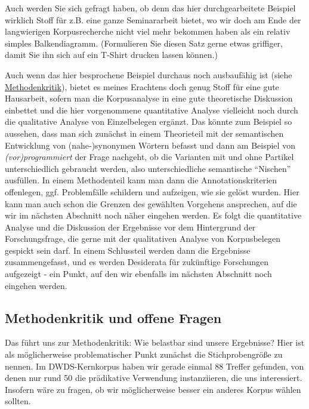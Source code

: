 \documentclass[]{article}
\begin{document}
Auch werden Sie sich gefragt haben, ob denn das hier durchgearbeitete
Beispiel wirklich Stoff für z.B. eine ganze Seminararbeit bietet, wo wir
doch am Ende der langwierigen Korpusrecherche nicht viel mehr bekommen
haben als ein relativ simples Balkendiagramm. (Formulieren Sie diesen
Satz gerne etwas griffiger, damit Sie ihn sich auf ein T-Shirt drucken
lassen können.)

Auch wenn das hier besprochene Beispiel durchaus noch ausbaufähig ist
(siehe
\protect\hyperlink{methodenkritik-und-offene-fragen}{Methodenkritik}),
bietet es meines Erachtens doch genug Stoff für eine gute Hausarbeit,
sofern man die Korpusanalyse in eine gute theoretische Diskussion
einbettet und die hier vorgenommene quantitative Analyse vielleicht noch
durch die qualitative Analyse von Einzelbelegen ergänzt. Das könnte zum
Beispiel so aussehen, dass man sich zunächst in einem Theorieteil mit
der semantischen Entwicklung von (nahe-)synonymen Wörtern befasst und
dann am Beispiel von \emph{(vor)programmiert} der Frage nachgeht, ob die
Varianten mit und ohne Partikel unterschiedlich gebraucht werden, also
unterschiedliche semantische ``Nischen'' ausfüllen. In einem
Methodenteil kann man dann die Annotationskriterien offenlegen, ggf.
Problemfälle schildern und aufzeigen, wie sie gelöst wurden. Hier kann
man auch schon die Grenzen des gewählten Vorgehens ansprechen, auf die
wir im nächsten Abschnitt noch näher eingehen werden. Es folgt die
quantitative Analyse und die Diskussion der Ergebnisse vor dem
Hintergrund der Forschungsfrage, die gerne mit der qualitativen Analyse
von Korpusbelegen gespickt sein darf. In einem Schlussteil werden dann
die Ergebnisse zusammengefasst, und es werden Desiderata für zukünftige
Forschungen aufgezeigt - ein Punkt, auf den wir ebenfalls im nächsten
Abschnitt noch eingehen werden.

\hypertarget{methodenkritik-und-offene-fragen}{\subsection{Methodenkritik
und offene Fragen}\label{methodenkritik-und-offene-fragen}}

Das führt uns zur Methodenkritik: Wie belastbar sind unsere Ergebnisse?
Hier ist als möglicherweise problematischer Punkt zunächst die
Stichprobengröße zu nennen. Im DWDS-Kernkorpus haben wir gerade einmal
88 Treffer gefunden, von denen nur rund 50 die prädikative Verwendung
instanziieren, die uns interessiert. Insofern wäre zu fragen, ob wir
möglicherweise besser ein anderes Korpus wählen sollten.
\end{document}
